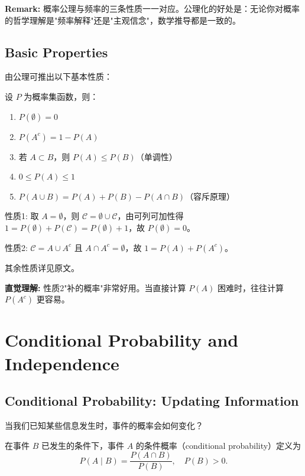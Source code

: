 \textbf{Remark:} 概率公理与频率的三条性质一一对应。公理化的好处是：无论你对概率的哲学理解是"频率解释"还是"主观信念"，数学推导都是一致的。

\subsection{Basic Properties}\label{sub:basic-properties}

由公理可推出以下基本性质：

\begin{Theorem}[概率的基本性质]\label{prop:probability-properties}
设 $P$ 为概率集函数，则：
\begin{enumerate}
    \item $P(\emptyset) = 0$
    \item $P(A^c) = 1 - P(A)$
    \item 若 $A \subset B$，则 $P(A) \leq P(B)$（单调性）
    \item $0 \leq P(A) \leq 1$
    \item $P(A \cup B) = P(A) + P(B) - P(A \cap B)$（容斥原理）
\end{enumerate}
\end{Theorem}

\begin{Proof}
性质1: 取 $A = \emptyset$，则 $\mathcal{C} = \emptyset \cup \mathcal{C}$，由可列可加性得 $1 = P(\emptyset) + P(\mathcal{C}) = P(\emptyset) + 1$，故 $P(\emptyset) = 0$。

性质2: $\mathcal{C} = A \cup A^c$ 且 $A \cap A^c = \emptyset$，故 $1 = P(A) + P(A^c)$。

其余性质详见原文。
\end{Proof}

\textbf{直觉理解:} 性质2"补的概率"非常好用。当直接计算 $P(A)$ 困难时，往往计算 $P(A^c)$ 更容易。

\section{Conditional Probability and Independence}\label{sec:conditional-independence}

\subsection{Conditional Probability: Updating Information}\label{sub:conditional-probability}

当我们已知某些信息发生时，事件的概率会如何变化？

\begin{Definition}[条件概率]\label{def:conditional-probability}
在事件 $B$ 已发生的条件下，事件 $A$ 的条件概率（conditional probability）定义为
\[
P(A \mid B) = \frac{P(A \cap B)}{P(B)}, \quad P(B) > 0.
\]
\end{Definition}

